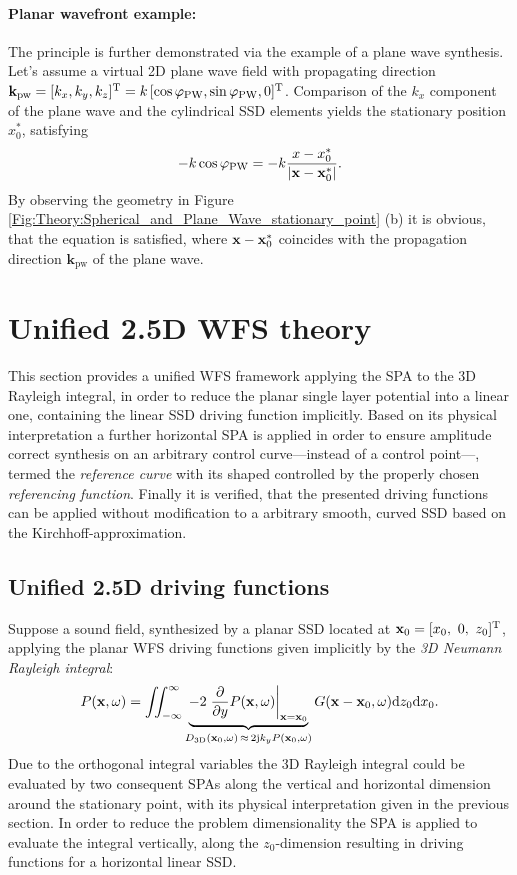 \paragraph{Planar wavefront example: \\}
The principle is further demonstrated via the example of a plane wave synthesis.
Let's assume a virtual 2D plane wave field with propagating direction $\mathbf{k}_\text{pw}=[k_x,k_y,k_z]^{\mathrm{T}}=k\,[\cos\varphi_\text{PW},\sin\varphi_\text{PW},0]^{\mathrm{T}}$.
Comparison of the $k_x$ component of the plane wave and the cylindrical SSD elements yields the stationary position $x_0^*$, satisfying
\begin{equation}
\label{Eq:Phix0_PlaneWaveExample}
- k \cos\varphi_\text{PW} = -k \frac{x-x_0^*}{|\mathbf{x} - \mathbf{x}_0^*|}.
\end{equation}
By observing the geometry in Figure \ref{Fig:Theory:Spherical_and_Plane_Wave_stationary_point} (b) it is obvious, that the equation is satisfied, where $\mathbf{x}-\mathbf{x}_0^*$ coincides with the propagation direction $\mathbf{k}_\text{pw}$ of the plane wave.


\section{Unified 2.5D WFS theory}
\label{Sec:Unified_WFS}

This section provides a unified WFS framework applying the SPA to the 3D Rayleigh integral, in order to reduce the planar single layer potential into a linear one, containing the linear SSD driving function implicitly.
Based on its physical interpretation a further horizontal SPA is applied in order to ensure amplitude correct synthesis on an arbitrary control curve---instead of a control point---, termed the \emph{reference curve} with its shaped controlled by the properly chosen \emph{referencing function}.
Finally it is verified, that the presented driving functions can be applied without modification to a arbitrary smooth, curved SSD based on the Kirchhoff-approximation.

\subsection{Unified 2.5D driving functions}
Suppose a sound field, synthesized by a planar SSD located at $\mathbf{x}_0 = [x_0,\ 0,\ z_0]^{\mathrm{T}}$, applying the planar WFS driving functions given implicitly by the \emph{3D Neumann Rayleigh integral}:
\begin{equation}
P(\mathbf{x},\omega) = \iint_{-\infty}^{\infty} 
\underbrace{ -2 \left. \frac{\partial}{\partial y} P(\mathbf{x}, \omega) \right|_{\mathbf{x} = \mathbf{x}_0}}_{ D_{3\mathrm{D}}(\mathbf{x}_0, \omega) \, \approx \, 2 \mathrm{j} k_y P(\mathbf{x}_0,\omega) }
G(\mathbf{x}-\mathbf{x}_0, \omega) \mathrm{d} z_0 \mathrm{d} x_0.
\label{eq:25D_WFS:3D_neumann} 
\end{equation}
Due to the orthogonal integral variables the 3D Rayleigh integral could be evaluated by two consequent SPAs along the vertical and horizontal dimension around the stationary point, with its physical interpretation given in the previous section.
In order to reduce the problem dimensionality the SPA is applied to evaluate the integral vertically, along the $z_0$-dimension resulting in driving functions for a horizontal linear SSD.

